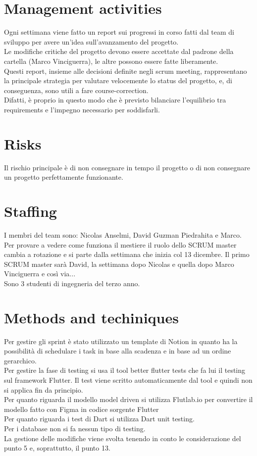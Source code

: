 \documentclass{article}
\begin{document}
\section{Management activities}
Ogni settimana viene fatto un report sui progressi in corso fatti dal team di sviluppo per avere un'idea sull'avanzamento del progetto.
\\Le modifiche critiche del progetto devono essere accettate dal padrone della cartella (Marco Vinciguerra), le altre possono essere fatte 
liberamente.
\\ Questi report, insieme alle decisioni definite negli scrum meeting, rappresentano la principale strategia per valutare velocemente lo status del progetto, e, di conseguenza, sono utili a fare course-correction.
\\ Difatti, è proprio in questo modo che è previsto bilanciare l’equilibrio tra requirements e l’impegno necessario per soddisfarli.  
\section{Risks}
Il rischio principale è di non consegnare in tempo il progetto o di non consegnare un progetto perfettamente funzionante.
\section{Staffing}
I membri del team sono: Nicolas Anselmi, David Guzman Piedrahita e Marco.
\\Per provare a vedere come funziona il mestiere il ruolo dello SCRUM master cambia a rotazione e si parte dalla settimana 
che inizia col 13 dicembre. Il primo SCRUM master sarà David, la settimana dopo Nicolas e quella dopo Marco Vinciguerra e così via...
\\Sono 3 studenti di ingegneria del terzo anno.

\section{Methods and techiniques}
Per gestire gli sprint è stato utilizzato un template di Notion in quanto ha la possibilità di schedulare i task in base alla scadenza e in base ad un ordine gerarchico.
\\Per gestire la fase di testing si usa il tool better flutter tests che fa lui il testing sul framework Flutter. Il test viene scritto automaticamente dal tool e quindi 
non si applica fin da principio.
\\Per quanto riguarda il modello model driven si utilizza Flutlab.io per convertire il modello fatto con Figma in codice sorgente Flutter
\\Per quanto riguarda i test di Dart si utilizza Dart unit testing.
\\Per i database non si fa nessun tipo di testing.
\\La gestione delle modifiche viene svolta tenendo in conto le considerazione del punto 5 e, soprattutto, il punto 13.
\end{document}
